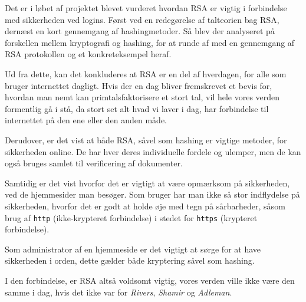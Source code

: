 Det er i løbet af projektet blevet vurderet hvordan RSA er vigtig i forbindelse med sikkerheden ved logins.
Først ved en redegørelse af talteorien bag RSA, dernæst en kort gennemgang af hashingmetoder.
Så blev der analyseret på forskellen mellem kryptografi og hashing, for at runde af med en gennemgang af RSA protokollen og et konkreteksempel heraf.
\par
Ud fra dette, kan det konkluderes at RSA er en del af hverdagen, for alle som bruger internettet dagligt.
Hvis der en dag bliver fremskrevet et bevis for, hvordan man nemt kan primtalsfaktorisere et stort tal, vil hele vores verden formentlig gå i stå, da stort set alt hvad vi laver i dag, har forbindelse til internettet på den ene eller den anden måde.

Derudover, er det vist at både RSA, såvel som hashing er vigtige metoder, for sikkerheden online. De har hver deres individuelle fordele og ulemper, men de kan også bruges samlet til verificering af dokumenter.

Samtidig er det vist hvorfor det er vigtigt at være opmærksom på sikkerheden, ved de hjemmesider man besøger.
Som bruger har man ikke så stor indflydelse på sikkerheden, hvorfor det er godt at holde øje med tegn på sårbarheder, såsom brug af \texttt{http} (ikke-krypteret forbindelse) i stedet for \texttt{https} (krypteret forbindelse).

Som administrator af en hjemmeside er det vigtigt at sørge for at have sikkerheden i orden, dette gælder både kryptering såvel som hashing.

I den forbindelse, er RSA altså voldsomt vigtig, vores verden ville ikke være den samme i dag, hvis det ikke var for \textit{Rivers}, \textit{Shamir} og \textit{Adleman}.

